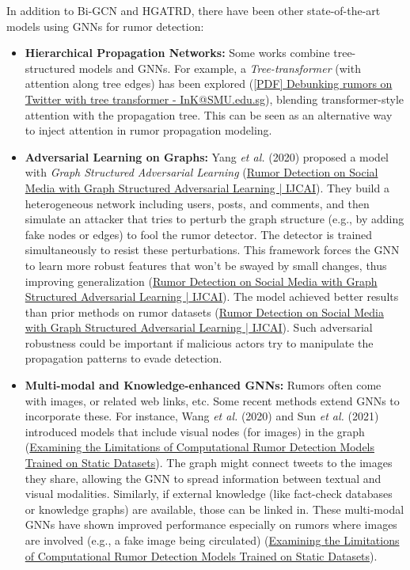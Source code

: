 \documentclass[12pt,a4paper]{report}
\begin{document}
In addition to Bi-GCN and HGATRD, there have been other state-of-the-art models using GNNs for rumor detection:
\begin{itemize}[leftmargin=1.2cm]
    \item \textbf{Hierarchical Propagation Networks:} Some works combine tree-structured models and GNNs. For example, a \textit{Tree-transformer} (with attention along tree edges) has been explored (\href{https://ink.library.smu.edu.sg/cgi/viewcontent.cgi?article=6602&context=sis_research#:~:text=,visit%20the%20root%20of}{[PDF] Debunking rumors on Twitter with tree transformer - InK@SMU.edu.sg}), blending transformer-style attention with the propagation tree. This can be seen as an alternative way to inject attention in rumor propagation modeling.
    \item \textbf{Adversarial Learning on Graphs:} Yang \textit{et al.} (2020) proposed a model with \textit{Graph Structured Adversarial Learning} (\href{https://www.ijcai.org/proceedings/2020/197#:~:text=this%20work%20is%20to%20develop,achieves%20better%20results%20than%20the}{Rumor Detection on Social Media with Graph Structured Adversarial Learning | IJCAI}). They build a heterogeneous network including users, posts, and comments, and then simulate an attacker that tries to perturb the graph structure (e.g., by adding fake nodes or edges) to fool the rumor detector. The detector is trained simultaneously to resist these perturbations. This framework forces the GNN to learn more robust features that won’t be swayed by small changes, thus improving generalization (\href{https://www.ijcai.org/proceedings/2020/197#:~:text=information%20network%20to%20model%20the,art%20methods}{Rumor Detection on Social Media with Graph Structured Adversarial Learning | IJCAI}). The model achieved better results than prior methods on rumor datasets (\href{https://www.ijcai.org/proceedings/2020/197#:~:text=where%20the%20attacker%20tries%20to,achieves%20better%20results%20than%20the}{Rumor Detection on Social Media with Graph Structured Adversarial Learning | IJCAI}). Such adversarial robustness could be important if malicious actors try to manipulate the propagation patterns to evade detection.
    \item \textbf{Multi-modal and Knowledge-enhanced GNNs:} Rumors often come with images, or related web links, etc. Some recent methods extend GNNs to incorporate these. For instance, Wang \textit{et al.} (2020) and Sun \textit{et al.} (2021) introduced models that include visual nodes (for images) in the graph (\href{https://arxiv.org/html/2309.11576v2#:~:text=models%20have%20been%20employed%20to,54}{Examining the Limitations of Computational Rumor Detection Models Trained on Static Datasets}). The graph might connect tweets to the images they share, allowing the GNN to spread information between textual and visual modalities. Similarly, if external knowledge (like fact-check databases or knowledge graphs) are available, those can be linked in. These multi-modal GNNs have shown improved performance especially on rumors where images are involved (e.g., a fake image being circulated) (\href{https://arxiv.org/html/2309.11576v2#:~:text=models%20have%20been%20employed%20to,54}{Examining the Limitations of Computational Rumor Detection Models Trained on Static Datasets}).

\end{itemize}
\end{document}

